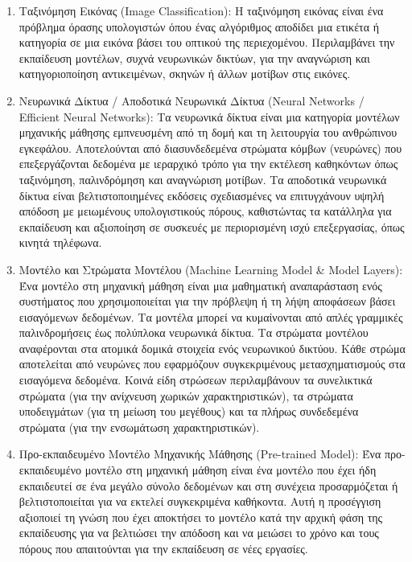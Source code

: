\begin{enumerate}
    \item Ταξινόμηση Εικόνας (Image Classification): Η ταξινόμηση εικόνας είναι ένα πρόβλημα όρασης υπολογιστών όπου ένας αλγόριθμος αποδίδει μια ετικέτα ή κατηγορία σε μια εικόνα βάσει του οπτικού της περιεχομένου. Περιλαμβάνει την εκπαίδευση μοντέλων, συχνά νευρωνικών δικτύων, για την αναγνώριση και κατηγοριοποίηση αντικειμένων, σκηνών ή άλλων μοτίβων στις εικόνες. 

    \item Νευρωνικά Δίκτυα / Αποδοτικά Νευρωνικά Δίκτυα (Neural Networks / Efficient Neural Networks): Τα νευρωνικά δίκτυα είναι μια κατηγορία μοντέλων μηχανικής μάθησης εμπνευσμένη από τη δομή και τη λειτουργία του ανθρώπινου εγκεφάλου. Αποτελούνται από διασυνδεδεμένα στρώματα κόμβων (νευρώνες) που επεξεργάζονται δεδομένα με ιεραρχικό τρόπο για την εκτέλεση καθηκόντων όπως ταξινόμηση, παλινδρόμηση και αναγνώριση μοτίβων. Τα αποδοτικά νευρωνικά δίκτυα είναι βελτιστοποιημένες εκδόσεις σχεδιασμένες να επιτυγχάνουν υψηλή απόδοση με μειωμένους υπολογιστικούς πόρους, καθιστώντας τα κατάλληλα για εκπαίδευση και αξιοποίηση σε συσκευές με περιορισμένη ισχύ επεξεργασίας, όπως κινητά τηλέφωνα. 

    \item Μοντέλο και Στρώματα Μοντέλου (Machine Learning Model \& Model Layers): Ένα μοντέλο στη μηχανική μάθηση είναι μια μαθηματική αναπαράσταση ενός συστήματος που χρησιμοποιείται για την πρόβλεψη ή τη λήψη αποφάσεων βάσει εισαγόμενων δεδομένων. Τα μοντέλα μπορεί να κυμαίνονται από απλές γραμμικές παλινδρομήσεις έως πολύπλοκα νευρωνικά δίκτυα. Τα στρώματα μοντέλου αναφέρονται στα ατομικά δομικά στοιχεία ενός νευρωνικού δικτύου. Κάθε στρώμα αποτελείται από νευρώνες που εφαρμόζουν συγκεκριμένους μετασχηματισμούς στα εισαγόμενα δεδομένα. Κοινά είδη στρώσεων περιλαμβάνουν τα συνελικτικά στρώματα (για την ανίχνευση χωρικών χαρακτηριστικών), τα στρώματα υποδειγμάτων (για τη μείωση του μεγέθους) και τα πλήρως συνδεδεμένα στρώματα (για την ενσωμάτωση χαρακτηριστικών). 

    \item Προ-εκπαιδευμένο Μοντέλο Μηχανικής Μάθησης (Pre-trained Model): Ένα προ-εκπαιδευμένο μοντέλο στη μηχανική μάθηση είναι ένα μοντέλο που έχει ήδη εκπαιδευτεί σε ένα μεγάλο σύνολο δεδομένων και στη συνέχεια προσαρμόζεται ή βελτιστοποιείται για να εκτελεί συγκεκριμένα καθήκοντα. Αυτή η προσέγγιση αξιοποιεί τη γνώση που έχει αποκτήσει το μοντέλο κατά την αρχική φάση της εκπαίδευσης για να βελτιώσει την απόδοση και να μειώσει το χρόνο και τους πόρους που απαιτούνται για την εκπαίδευση σε νέες εργασίες. 


\end{enumerate}
